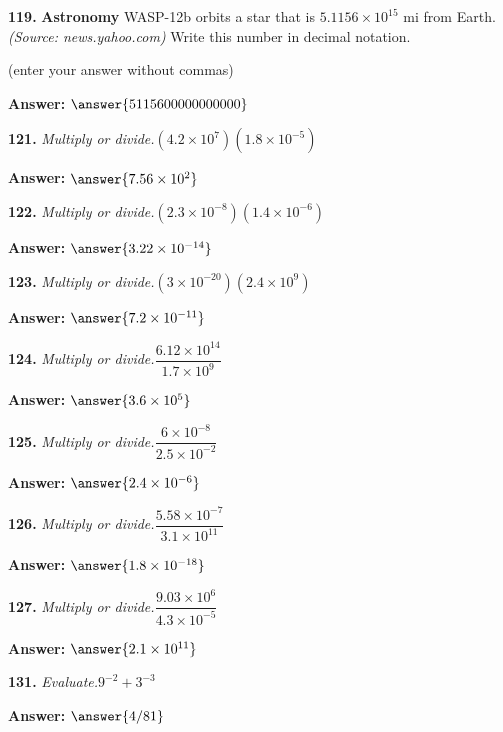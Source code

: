 \documentclass{ximera}
\begin{document}
\begin{problem}
\textbf{119.} \textbf{Astronomy} WASP-12b orbits a star that is $5.1156 \times 10^{15}$ mi from
  Earth. \emph{(Source: news.yahoo.com)} Write this number in decimal notation.

(enter your answer without commas)

\textbf{Answer:} $\answer{5115600000000000}$
\end{problem}

\begin{problem}
\textbf{121.} \emph{Multiply or divide.}\quad $(4.2 \times 10^7)(1.8 \times 10^{-5})$

\textbf{Answer:} $\answer{7.56\times 10^2}$
\end{problem}

\begin{problem}
\textbf{122.} \emph{Multiply or divide.}\quad $(2.3 \times 10^{-8})(1.4 \times 10^{-6})$

\textbf{Answer:} $\answer{3.22\times 10^{-14}}$
\end{problem}

\begin{problem}
\textbf{123.} \emph{Multiply or divide.}\quad $(3 \times 10^{-20})(2.4 \times 10^9)$

\textbf{Answer:} $\answer{7.2\times 10^{-11}}$
\end{problem}

\begin{problem}
\textbf{124.} \emph{Multiply or divide.}\quad $\dfrac{6.12 \times 10^{14}}{1.7 \times 10^9}$

\textbf{Answer:} $\answer{3.6\times 10^5}$
\end{problem}

\begin{problem}
\textbf{125.} \emph{Multiply or divide.}\quad $\dfrac{6 \times 10^{-8}}{2.5 \times 10^{-2}}$

\textbf{Answer:} $\answer{2.4\times 10^{-6}}$
\end{problem}

\begin{problem}
\textbf{126.} \emph{Multiply or divide.}\quad $\dfrac{5.58 \times 10^{-7}}{3.1 \times 10^{11}}$

\textbf{Answer:} $\answer{1.8\times 10^{-18}}$
\end{problem}

\begin{problem}
\textbf{127.} \emph{Multiply or divide.}\quad $\dfrac{9.03 \times 10^6}{4.3 \times 10^{-5}}$

\textbf{Answer:} $\answer{2.1\times 10^{11}}$
\end{problem}

\begin{problem}
\textbf{131.} \emph{Evaluate.}\quad $9^{-2} + 3^{-3}$

\textbf{Answer:} $\answer{4/81}$
\end{problem}
\end{document}
